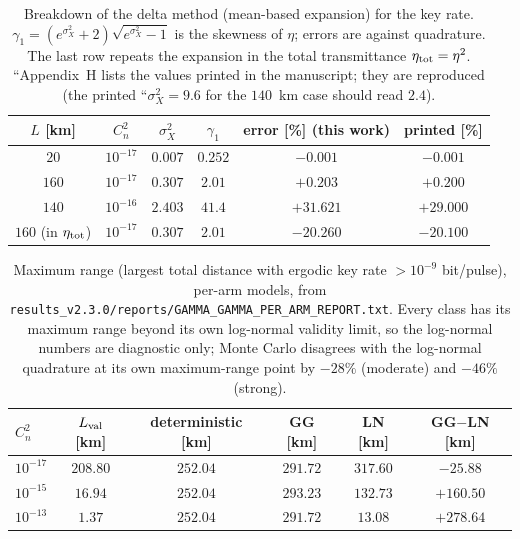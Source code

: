 \begin{table}[htbp]
\centering\small
\caption{Breakdown of the delta method (mean-based expansion) for the key rate. $\gamma_1=(e^{\sigma_X^2}+2)\sqrt{e^{\sigma_X^2}-1}$ is the skewness of $\eta$; errors are against quadrature. The last row repeats the expansion in the total transmittance $\eta_{\rm tot}=\eta^2$. ``Appendix~H lists the values printed in the manuscript; they are reproduced (the printed ``$\sigma_X^2=9.6$ for the $140$~km case should read $2.4$).}
\label{tab:delta}
\begin{tabular}{cccccc}
\toprule
$L$ [km] & $C_n^2$ & $\sigma_X^2$ & $\gamma_1$ & error [\%] (this work) & printed [\%]\\
\midrule
$20$ & $10^{-17}$ & $0.007$ & $0.252$ & $-0.001$ & $-0.001$ \\
$160$ & $10^{-17}$ & $0.307$ & $2.01$ & $+0.203$ & $+0.200$ \\
$140$ & $10^{-16}$ & $2.403$ & $41.4$ & $+31.621$ & $+29.000$ \\
$160$ (in $\eta_{\rm tot}$) & $10^{-17}$ & $0.307$ & $2.01$ & $-20.260$ & $-20.100$ \\

\bottomrule
\end{tabular}
\end{table}

\begin{table}[htbp]
\centering\small
\caption{Maximum range (largest total distance with ergodic key rate $>10^{-9}$ bit/pulse), per-arm models, from \texttt{results\_v2.3.0/reports/GAMMA\_GAMMA\_PER\_ARM\_REPORT.txt}. Every class has its maximum range beyond its own log-normal validity limit, so the log-normal numbers are diagnostic only; Monte Carlo disagrees with the log-normal quadrature at its own maximum-range point by $-28\%$ (moderate) and $-46\%$ (strong).}
\label{tab:range-ln}
\begin{tabular}{lccccc}
\toprule
$C_n^2$ & $L_{\rm val}$ [km] & deterministic [km] & GG [km] & LN [km] & GG$-$LN [km] \\
\midrule
$10^{-17}$ & $208.80$ & $252.04$ & $291.72$ & $317.60$ & $-25.88$ \\
$10^{-15}$ & $16.94$ & $252.04$ & $293.23$ & $132.73$ & $+160.50$ \\
$10^{-13}$ & $1.37$ & $252.04$ & $291.72$ & $13.08$ & $+278.64$ \\
\bottomrule
\end{tabular}
\end{table}
